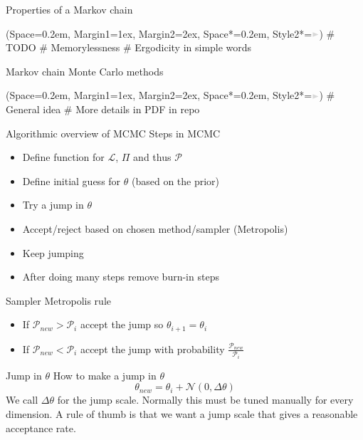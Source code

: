 \documentclass[12pt, aspectratio=149]{beamer}
\newcommand{\listSpace}{0.2em}
\theoremstyle{plain}
\begin{document}
\begin{frame}[fragile]{Properties of a Markov chain}
	\begin{easylist}
		\ListProperties(Space=\listSpace, Margin1=1ex, Margin2=2ex, Space*=\listSpace, Style2*=$\color{bggraydark}\blacktriangleright$\space)
		# TODO
		# Memorylessness
		# Ergodicity in simple words
	\end{easylist}
\end{frame}

\begin{frame}[fragile]{Markov chain Monte Carlo methods}
	\begin{easylist}
		\ListProperties(Space=\listSpace, Margin1=1ex, Margin2=2ex, Space*=\listSpace, Style2*=$\color{bggraydark}\blacktriangleright$\space)
		# General idea
		# More details in PDF in repo
	\end{easylist}
\end{frame}

\begin{frame}[fragile]{Algorithmic overview of MCMC}
Steps in MCMC
\begin{itemize}
\item Define function for $\mathcal{L}$, $\Pi$ and thus $\mathcal{P}$
\item Define initial guess for $\theta$ (based on the prior)
\item Try a jump in $\theta$
\item Accept/reject based on chosen method/sampler (Metropolis)
\item Keep jumping
\item After doing many steps remove burn-in steps
\end{itemize}
\end{frame}

\begin{frame}{Sampler}
Metropolis rule
\begin{itemize}
\item If $\mathcal{P}_{new}>\mathcal{P}_{i}$ accept the jump so $\theta_{i+1}=\theta_i$
\item If $\mathcal{P}_{new}<\mathcal{P}_{i}$ accept the jump with probability $\frac{\mathcal{P}_{new}}{\mathcal{P}_i}$
\end{itemize}
\end{frame}

\begin{frame}{Jump in $\theta$}
How to make a jump in $\theta$
\begin{equation}
\theta_{new} = \theta_i + \mathcal{N}(0, \Delta\theta)
\end{equation}
We call $\Delta\theta$ for the jump scale. Normally this must be tuned manually for every dimension. A rule of thumb is that we want a jump scale that gives a reasonable acceptance rate.  
\end{frame}
\end{document}
